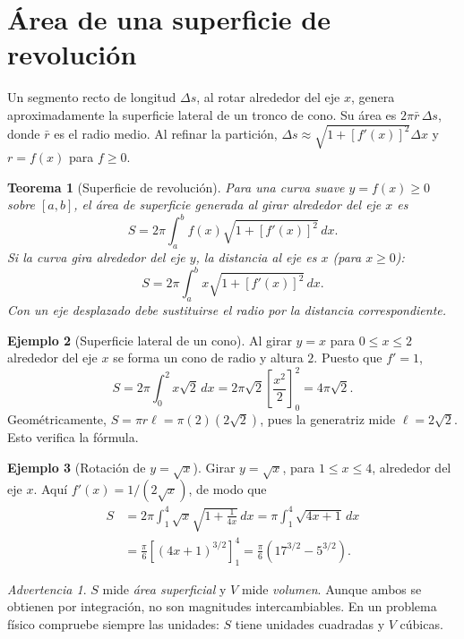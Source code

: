 \documentclass[12pt]{article}
\newtheorem{teorema}{Teorema}[section]
\theoremstyle{definition}
\newtheorem{ejemplo}[teorema]{Ejemplo}
\theoremstyle{remark}
\newtheorem*{advertencia}{Advertencia}
\newcommand{\dd}{\,dx}
\begin{document}
\section{Área de una superficie de revolución}
Un segmento recto de longitud $\Delta s$, al rotar alrededor del eje $x$, genera aproximadamente la superficie lateral de un tronco de cono. Su área es $2\pi\bar r\,\Delta s$, donde $\bar r$ es el radio medio. Al refinar la partición, $\Delta s\approx\sqrt{1+[f'(x)]^2}\Delta x$ y $r=f(x)$ para $f\geq0$.
\begin{teorema}[Superficie de revolución]
Para una curva suave $y=f(x)\ge0$ sobre $[a,b]$, el área de superficie generada al girar alrededor del eje $x$ es
\[\boxed{S=2\pi\int_a^b f(x)\sqrt{1+[f'(x)]^2}\dd.}\]
Si la curva gira alrededor del eje $y$, la distancia al eje es $x$ (para $x\ge0$):
\[\boxed{S=2\pi\int_a^b x\sqrt{1+[f'(x)]^2}\dd.}\]
Con un eje desplazado debe sustituirse el radio por la distancia correspondiente.
\end{teorema}
\begin{ejemplo}[Superficie lateral de un cono]
Al girar $y=x$ para $0\le x\le2$ alrededor del eje $x$ se forma un cono de radio y altura $2$. Puesto que $f'=1$,
\[S=2\pi\int_0^2 x\sqrt2\dd
=2\pi\sqrt2\left[\frac{x^2}{2}\right]_0^2
=\boxed{4\pi\sqrt2}.\]
Geométricamente, $S=\pi r\ell=\pi(2)(2\sqrt2)$, pues la generatriz mide $\ell=2\sqrt2$. Esto verifica la fórmula.
\end{ejemplo}
\begin{ejemplo}[Rotación de $y=\sqrt x$]
Girar $y=\sqrt x$, para $1\le x\le4$, alrededor del eje $x$. Aquí $f'(x)=1/(2\sqrt x)$, de modo que
\begin{align*}
S&=2\pi\int_1^4\sqrt x\sqrt{1+\frac{1}{4x}}\dd
=\pi\int_1^4\sqrt{4x+1}\dd\\
&=\frac{\pi}{6}\left[(4x+1)^{3/2}\right]_1^4
=\boxed{\frac{\pi}{6}(17^{3/2}-5^{3/2})}.
\end{align*}
\end{ejemplo}
\begin{advertencia}
$S$ mide \emph{área superficial} y $V$ mide \emph{volumen}. Aunque ambos se obtienen por integración, no son magnitudes intercambiables. En un problema físico compruebe siempre las unidades: $S$ tiene unidades cuadradas y $V$ cúbicas.
\end{advertencia}

\end{document}
